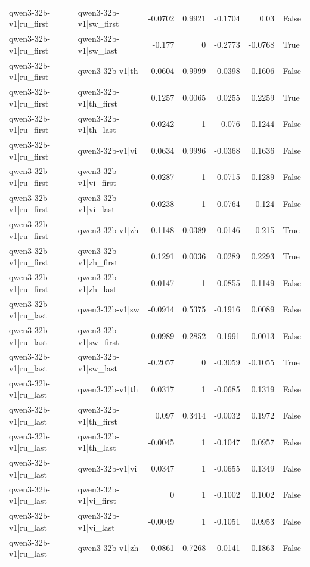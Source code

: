 \begin{table}
\begin{tabular}{l l r r r r l}
qwen3-32b-v1|ru_first & qwen3-32b-v1|sw_first & -0.0702 & 0.9921 & -0.1704 & 0.03 & False \\
qwen3-32b-v1|ru_first & qwen3-32b-v1|sw_last & -0.177 & 0 & -0.2773 & -0.0768 & True \\
qwen3-32b-v1|ru_first & qwen3-32b-v1|th & 0.0604 & 0.9999 & -0.0398 & 0.1606 & False \\
qwen3-32b-v1|ru_first & qwen3-32b-v1|th_first & 0.1257 & 0.0065 & 0.0255 & 0.2259 & True \\
qwen3-32b-v1|ru_first & qwen3-32b-v1|th_last & 0.0242 & 1 & -0.076 & 0.1244 & False \\
qwen3-32b-v1|ru_first & qwen3-32b-v1|vi & 0.0634 & 0.9996 & -0.0368 & 0.1636 & False \\
qwen3-32b-v1|ru_first & qwen3-32b-v1|vi_first & 0.0287 & 1 & -0.0715 & 0.1289 & False \\
qwen3-32b-v1|ru_first & qwen3-32b-v1|vi_last & 0.0238 & 1 & -0.0764 & 0.124 & False \\
qwen3-32b-v1|ru_first & qwen3-32b-v1|zh & 0.1148 & 0.0389 & 0.0146 & 0.215 & True \\
qwen3-32b-v1|ru_first & qwen3-32b-v1|zh_first & 0.1291 & 0.0036 & 0.0289 & 0.2293 & True \\
qwen3-32b-v1|ru_first & qwen3-32b-v1|zh_last & 0.0147 & 1 & -0.0855 & 0.1149 & False \\
qwen3-32b-v1|ru_last & qwen3-32b-v1|sw & -0.0914 & 0.5375 & -0.1916 & 0.0089 & False \\
qwen3-32b-v1|ru_last & qwen3-32b-v1|sw_first & -0.0989 & 0.2852 & -0.1991 & 0.0013 & False \\
qwen3-32b-v1|ru_last & qwen3-32b-v1|sw_last & -0.2057 & 0 & -0.3059 & -0.1055 & True \\
qwen3-32b-v1|ru_last & qwen3-32b-v1|th & 0.0317 & 1 & -0.0685 & 0.1319 & False \\
qwen3-32b-v1|ru_last & qwen3-32b-v1|th_first & 0.097 & 0.3414 & -0.0032 & 0.1972 & False \\
qwen3-32b-v1|ru_last & qwen3-32b-v1|th_last & -0.0045 & 1 & -0.1047 & 0.0957 & False \\
qwen3-32b-v1|ru_last & qwen3-32b-v1|vi & 0.0347 & 1 & -0.0655 & 0.1349 & False \\
qwen3-32b-v1|ru_last & qwen3-32b-v1|vi_first & 0 & 1 & -0.1002 & 0.1002 & False \\
qwen3-32b-v1|ru_last & qwen3-32b-v1|vi_last & -0.0049 & 1 & -0.1051 & 0.0953 & False \\
qwen3-32b-v1|ru_last & qwen3-32b-v1|zh & 0.0861 & 0.7268 & -0.0141 & 0.1863 & False \\

\end{tabular}
\end{table}
